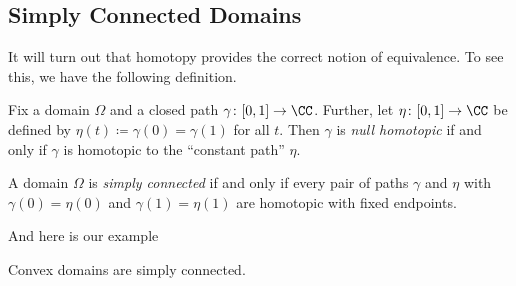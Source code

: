 \documentclass[../notes.tex]{subfiles}
\begin{document}
\subsection{Simply Connected Domains}
It will turn out that homotopy provides the correct notion of equivalence. To see this, we have the following definition.
\begin{definition}
	Fix a domain $\Omega$ and a closed path $\gamma\colon [0,1]\to\CC$. Further, let $\eta\colon [0,1]\to\CC$ be defined by $\eta(t)\coloneqq \gamma(0)=\gamma(1)$ for all $t$. Then $\gamma$ is \textit{null homotopic} if and only if $\gamma$ is homotopic to the ``constant path'' $\eta$.
\end{definition}
\begin{definition}
	A domain $\Omega$ is \textit{simply connected} if and only if every pair of paths $\gamma$ and $\eta$ with $\gamma(0)=\eta(0)$ and $\gamma(1)=\eta(1)$ are homotopic with fixed endpoints.
\end{definition}
And here is our example
\begin{lemma}
	Convex domains are simply connected.
\end{lemma}
\end{document}
